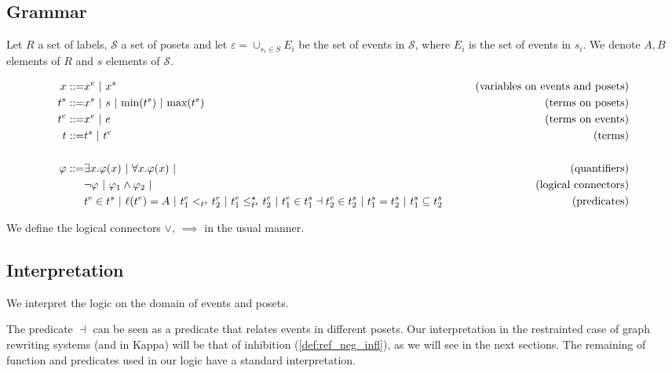 \subsection{Grammar}

Let $R$ a set of labels, $\mathcal{S}$ a set of posets and let $\varepsilon = \cup_{s_i\in S} E_i$ be the set of events in $\mathcal{S}$, where $E_i$ is the set of events in $s_i$.
We denote $A,B$ elements of $R$ and $s$ elements of $\mathcal{S}$.

\begin{align*}
  x ::= & x^e ~|~ x^s & \tag{variables on events and posets} \\
  t^s ::= & x^s ~|~ s ~|~ \text{min}(t^s) ~|~ \text{max}(t^s) &\tag{terms on posets} \\
  t^e ::= & x^e ~|~ e & \tag{terms on events}\\
  t ::= & t^s ~|~ t^e & \tag{terms}\\
  \\
  \varphi ::= & \exists x.\varphi(x) ~|~ \forall x.\varphi(x) ~|&\tag{quantifiers}\\
  & \neg \varphi ~|~\varphi_1 \wedge \varphi_2~|&\tag{logical connectors}\\
  & t^e\in t^s ~|~ \ell(t^e) = A ~|~ t^e_1 <_{t^s} t^e_2 ~|~ t^e_1 \leq^{\star}_{t^s} t^e_2 ~|~ t^e_1\in t^s_1 \dashv t^e_2\in t^s_2~|~ t^s_1 = t^s_2 ~|~ t^s_1\subseteq t^s_2
  & \tag{predicates}\\
\end{align*}

We define the logical connectors $\vee$, $\implies$ in the usual manner.

\subsection{Interpretation}

We interpret the logic on the domain of events and posets.


The predicate $\dashv$ can be seen as a predicate that relates events in different posets. Our interpretation in the restrainted case of graph rewriting systems (and in Kappa) will be that of inhibition (\autoref{def:ref_neg_infl}), as we will see in the next sections. The remaining of function and predicates used in our logic have a standard interpretation.

